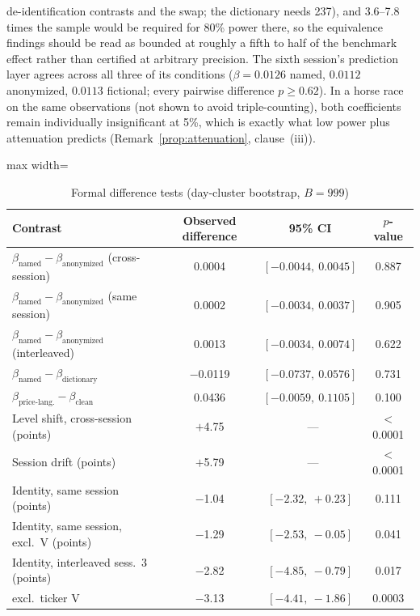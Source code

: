de-identification contrasts and the swap; the dictionary needs 237), and 3.6--7.8 times the sample would be required for 80\% power there, so the equivalence findings should be read as bounded at roughly a fifth to half of the benchmark effect rather than certified at arbitrary precision. The sixth session's prediction layer agrees across all three of its conditions ($\beta=0.0126$ named, $0.0112$ anonymized, $0.0113$ fictional; every pairwise difference $p\geq 0.62$). In a horse race on the same observations (not shown to avoid triple-counting), both coefficients remain individually insignificant at 5\%, which is exactly what low power plus attenuation predicts (Remark~\ref{prop:attenuation}, clause~(iii)).

\begin{table}[htbp]
\centering
\small
\caption{Formal difference tests (day-cluster bootstrap, $B=999$)}
\label{tab:diff}
\begin{threeparttable}
\begin{adjustbox}{max width=\textwidth}
\begin{tabular}{lccc}
\toprule
Contrast & Observed difference & 95\% CI & $p$-value \\
\midrule
$\beta_{\text{named}}-\beta_{\text{anonymized}}$ (cross-session) & 0.0004 & $[-0.0044,\ 0.0045]$ & 0.887 \\
$\beta_{\text{named}}-\beta_{\text{anonymized}}$ (same session) & 0.0002 & $[-0.0034,\ 0.0037]$ & 0.905 \\
$\beta_{\text{named}}-\beta_{\text{anonymized}}$ (interleaved) & 0.0013 & $[-0.0034,\ 0.0074]$ & 0.622 \\
$\beta_{\text{named}}-\beta_{\text{dictionary}}$ & $-$0.0119 & $[-0.0737,\ 0.0576]$ & 0.731 \\
$\beta_{\text{price-lang.}}-\beta_{\text{clean}}$ & 0.0436 & $[-0.0059,\ 0.1105]$ & 0.100 \\
Level shift, cross-session (points) & $+$4.75 &~--- & $<$0.0001 \\
Session drift (points) & $+$5.79 &~--- & $<$0.0001 \\
Identity, same session (points) & $-$1.04 & $[-2.32,\ +0.23]$ & 0.111 \\
Identity, same session, excl.\ V (points) & $-$1.29 & $[-2.53,\ -0.05]$ & 0.041 \\
Identity, interleaved sess.\ 3 (points) & $-$2.82 & $[-4.85,\ -0.79]$ & 0.017 \\
\quad excl.\ ticker V & $-$3.13 & $[-4.41,\ -1.86]$ & 0.0003 \\

\end{tabular}
\end{adjustbox}
\end{threeparttable}
\end{table}
